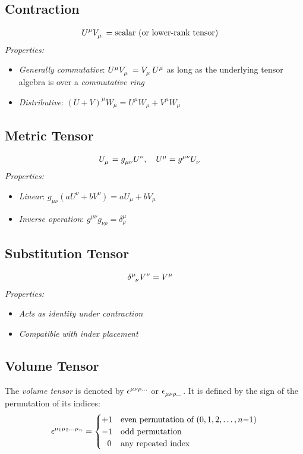 \documentclass{amsart}
\theoremstyle{definition}
\theoremstyle{remark}
\begin{document}
\subsection*{Contraction}
\begin{align*}
\tensor{U}{^\mu} \tensor{V}{_\mu} &= \text{scalar (or lower-rank tensor)}
\end{align*}
\emph{Properties:}
\begin{itemize}
  \item \emph{Generally commutative}: $\tensor{U}{^\mu} \tensor{V}{_\mu} = \tensor{V}{_\mu} \tensor{U}{^\mu}$ as long as the underlying tensor algebra is over a \emph{commutative ring}
  \item \emph{Distributive}: $(U + V)^\mu W_\mu = U^\mu W_\mu + V^\mu W_\mu$
\end{itemize}

\subsection*{Metric Tensor}
\begin{align*}
\tensor{U}{_\mu} &= \tensor{g}{_{\mu\nu}} \tensor{U}{^\nu}, \quad \tensor{U}{^\mu} = \tensor{g}{^{\mu\nu}} \tensor{U}{_\nu}
\end{align*}
\emph{Properties:}
\begin{itemize}
  \item \emph{Linear}: $g_{\mu\nu}(aU^\nu + bV^\nu) = aU_\mu + bV_\mu$
  \item \emph{Inverse operation}: $g^{\mu\nu}g_{\nu\rho} = \delta^\mu_\rho$
\end{itemize}

\subsection*{Substitution Tensor}
\begin{align*}
\tensor{\delta}{^\mu_\nu} V^\nu &= V^\mu
\end{align*}
\emph{Properties:}
\begin{itemize}
  \item \emph{Acts as identity under contraction}
  \item \emph{Compatible with index placement}
\end{itemize}

\subsection*{Volume Tensor}
The \emph{volume tensor} is denoted by $\tensor{\epsilon}{^{\mu\nu\rho\ldots}}$ or $\tensor{\epsilon}{_{\mu\nu\rho\ldots}}$. It is defined by the sign of the permutation of its indices:
\begin{equation*}
\tensor{\epsilon}{^{\mu_1\mu_2\ldots\mu_n}} = 
\begin{cases}
+1 & \text{even permutation of } (0,1,2,\ldots,n{-}1) \\
-1 & \text{odd permutation} \\
\ \ 0 & \text{any repeated index}
\end{cases}
\end{equation*}
\end{document}
